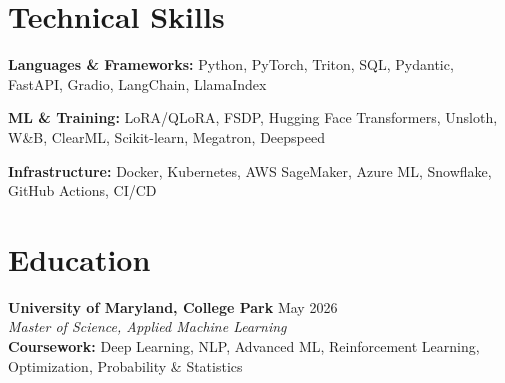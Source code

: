 \documentclass[letterpaper,11pt]{article}
\begin{document}
\section{Technical Skills}
\vspace{1pt}
\begin{itemize}[leftmargin=0.15in, label={}]
  \small{
    \item \textbf{Languages \& Frameworks:} Python, PyTorch, Triton, SQL, Pydantic, FastAPI, Gradio, LangChain, LlamaIndex
    \vspace{-0.2cm}
    \item \textbf{ML \& Training:} LoRA/QLoRA, FSDP, Hugging Face Transformers, Unsloth, W\&B, ClearML, Scikit-learn, Megatron, Deepspeed
    \vspace{-0.2cm}
    \item \textbf{Infrastructure:} Docker, Kubernetes, AWS SageMaker, Azure ML, Snowflake, GitHub Actions, CI/CD
  }
\end{itemize}
\vspace{-0.45cm}

\section{Education}
\vspace{1pt}
\begin{itemize}[leftmargin=0.15in, label={}]
  \small{
    \item \textbf{University of Maryland, College Park} \hfill May 2026 \\
          \textit{Master of Science, Applied Machine Learning} \\
          \textbf{Coursework:} Deep Learning, NLP, Advanced ML, Reinforcement Learning, Optimization, Probability \& Statistics
  }
\end{itemize}

\end{document}
